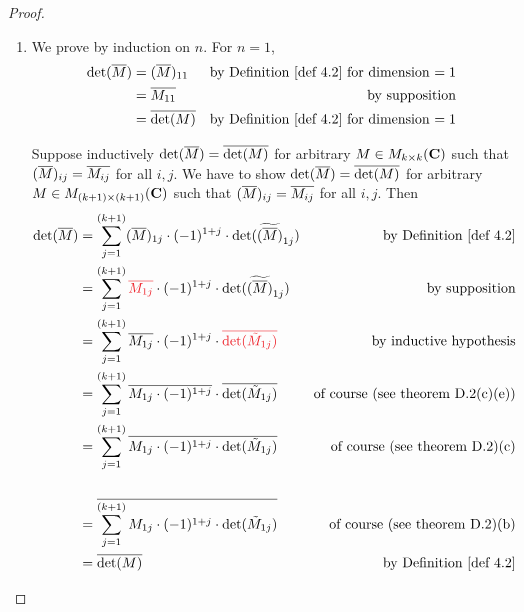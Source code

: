 \begin{proof} \ 

\begin{enumerate}
\item We prove by induction on \(n\).
For \(n = 1\),
\begin{align*}
    \det(\conjugatet{M}) & = (\conjugatet{M})_{11} & \text{by \DEF{4.2} for dimension \(= 1\)} \\
                         & = \conjugatet{M_{11}} & \text{by supposition} \\
                         & = \conjugatet{\det(M)} & \text{by \DEF{4.2} for dimension \(= 1\)}
\end{align*}

Suppose inductively \(\det(\overline{M}) = \overline{\det(M)}\) for arbitrary \(M \in M_{k \times k}(\mathbf{C})\) such that \((\overline{M})_{ij} = \overline{M_{ij}}\) for all \(i, j\).
We have to show \(\det(\overline{M}) = \overline{\det(M)}\) for arbitrary \(M \in M_{(k + 1) \times (k + 1)}(\mathbf{C})\) such that \((\overline{M})_{ij} = \overline{M_{ij}}\) for all \(i, j\).
Then
\begin{align*}
    \det(\conjugatet{M}) & = \sum_{j = 1}^{(k + 1)} (\conjugatet{M})_{1j} \cdot (-1)^{1 + j} \cdot \det(\widetilde{(\conjugatet{M})}_{1j}) & \text{by \DEF{4.2}} \\
                         & = \sum_{j = 1}^{(k + 1)} \RED{\conjugatet{M_{1j}}} \cdot (-1)^{1 + j} \cdot \det(\widetilde{(\conjugatet{M})}_{1j}) & \text{by supposition} \\
                         & = \sum_{j = 1}^{(k + 1)} \conjugatet{M_{1j}} \cdot (-1)^{1 + j} \cdot \RED{\conjugatet{\det(\tilde{M}_{1j})}} & \text{by inductive hypothesis} \\
                         & = \sum_{j = 1}^{(k + 1)} \conjugatet{M_{1j} \cdot (-1)^{1 + j}} \cdot \conjugatet{\det(\tilde{M}_{1j})} & \text{of course (see theorem D.2(c)(e))} \\
                         & = \sum_{j = 1}^{(k + 1)} \conjugatet{M_{1j} \cdot (-1)^{1 + j} \cdot \det(\tilde{M}_{1j})} & \text{of course (see theorem D.2)(c)} \\
                         \\
                         & = \conjugatet{\sum_{j = 1}^{(k + 1)} M_{1j} \cdot (-1)^{1 + j} \cdot \det(\tilde{M}_{1j})} & \text{of course (see theorem D.2)(b)} \\
                         & = \conjugatet{\det(M)} & \text{by \DEF{4.2}}
\end{align*}


\end{enumerate}
\end{proof}

